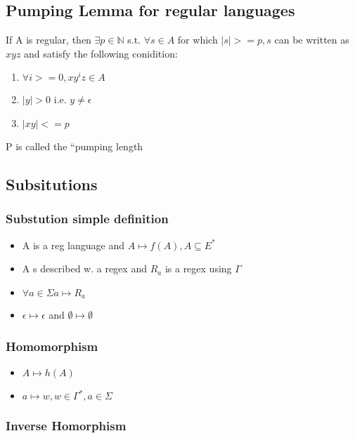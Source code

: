 \documentclass[11pt]{article}
\begin{document}
\subsection{Pumping Lemma for regular languages}
\label{sec-2.5}

  If A is regular, then $\exists p \in \mathbb{N}$ s.t. $\forall s
   \in A$ for which $|s| >= p, s$ can be written as  $xyz$ and
   satisfy the following conidition:
\begin{enumerate}
\item $\forall i >= 0, x y^i z \in A$
\item $|y|>0$ i.e. $y \neq \epsilon$
\item $|xy| <= p$
\end{enumerate}
  P is called the ``pumping length

\subsection{Subsitutions}
\label{sec-2.6}

\subsubsection{Substution simple definition}
\label{sec-2.6.1}

\begin{itemize}
\item A is a reg language and $A \mapsto f(A), A \subseteq E^*$
\item A s described w. a regex and $R_a$ is a regex using $\Gamma$
\item $\forall a \in \Sigma  a \mapsto R_a$
\item $\epsilon \mapsto \epsilon$ and $\emptyset \mapsto \emptyset$
\end{itemize}
\subsubsection{Homomorphism}
\label{sec-2.6.2}

\begin{itemize}
\item $A \mapsto h(A)$
\item $a \mapsto w, w \in \Gamma^*, a\in \Sigma$
\end{itemize}
\subsubsection{Inverse Homorphism}
\label{sec-2.6.3}
\end{document}
